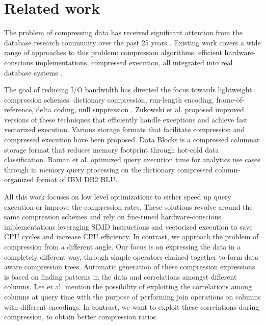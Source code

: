 
\chapter{Related work} %



\ifpdf
    \graphicspath{{7/figures/PNG/}{7/figures/PDF/}{7/figures/}}
\else
    \graphicspath{{7/figures/EPS/}{7/figures/}}
\fi


% 

The problem of compressing data has received significant attention from the database research community over the past 25 years \cite{abadi2006integrating,zukowski2006super,lang2016data,polychroniou2015efficient,graefe1991data}. Existing work covers a wide range of approaches to this problem: compression algorithms, efficient hardware-conscious implementations, compressed execution, all integrated into real database systems \cite{kemper2011hyper,zukowski2012vectorwise}.

The goal of reducing I/O bandwidth has directed the focus towards lightweight compression schemes: dictionary compression, run-length encoding, frame-of-reference, delta coding, null suppression \cite{abadi2006integrating,goldstein1998compressing,lemire2015decoding,roth1993database,zukowski2006super}. Zukowski et al. \cite{zukowski2006super} proposed improved versions of these techniques that efficiently handle exceptions and achieve fast vectorized execution. Various storage formats that facilitate compression and compressed execution have been proposed. Data Blocks \cite{lang2016data} is a compressed columnar storage format that reduces memory footprint through hot-cold data classification. Raman et al. \cite{raman2013db2} optimized query execution time for analytics use cases through in memory query processing on the dictionary compressed column-organized format of IBM DB2 BLU.

All this work focuses on low level optimizations to either speed up query execution or improve the compression rates. These solutions revolve around the same compression schemes and rely on fine-tuned hardware-conscious implementations leveraging SIMD instructions and vectorized execution to save CPU cycles and increase CPU efficiency. In contrast, we approach the problem of compression from a different angle. Our focus is on expressing the data in a completely different way, through simple operators chained together to form data-aware compression trees. Automatic generation of these compression expressions is based on finding patterns in the data and correlations amongst different columns. Lee et al. \cite{lee2014joins} mention the possibility of exploiting the correlations among columns at query time with the purpose of performing join operations on columns with different encodings. In contrast, we want to exploit these correlations during compression, to obtain better compression ratios.

